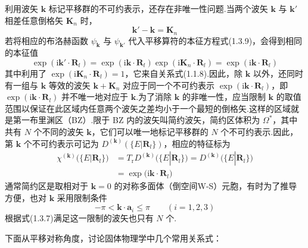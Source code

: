 利用波矢 $\boldsymbol{k}$ 标记平移群的不可约表示，还存在非唯一性问题.当两个波矢 $\boldsymbol{k}$ 与 $\boldsymbol{k}'$ 相差任意倒格矢 $\boldsymbol{K}_n$ 时，
\begin{equation}
  \boldsymbol{k}'-\boldsymbol{k}=\boldsymbol{K}_n
\end{equation}
若将相应的布洛赫函数 $\psi_{\boldsymbol{k}}$ 与 $\psi_{\boldsymbol{k}'}$ 代入平移算符的本征方程式(1.3.9)，会得到相同的本征值
\begin{equation}
  \exp(\mathrm{i}\boldsymbol{k}'\cdot\boldsymbol{R}_l)
  =\exp(\mathrm{i}\boldsymbol{k}\cdot\boldsymbol{R}_l)
  \exp(\mathrm{i}\boldsymbol{K}_n\cdot\boldsymbol{R}_l)
  =\exp(\mathrm{i}\boldsymbol{k}\cdot\boldsymbol{R}_l)
\end{equation}
其中利用了 $\exp(\mathrm{i}\boldsymbol{K}_n\cdot\boldsymbol{R}_l)=1$，它来自关系式(1.1.8).因此，除 $\boldsymbol{k}$ 以外，还同时有一组与 $\boldsymbol{k}$ 等效的波矢 $\boldsymbol{k}+\boldsymbol{K}_n$ 对应于同一个不可约表示 $\exp(\mathrm{i}\boldsymbol{k}\cdot\boldsymbol{R}_l)$，即 $\exp(\mathrm{i}\boldsymbol{k}\cdot\boldsymbol{R}_l)$ 并不唯一地对应于 $\boldsymbol{k}$.为了消除 $\boldsymbol{k}$ 的非唯一性，应当限制 $\boldsymbol{k}$ 的取值范围以保证在此区域内任意两个波矢之差均小于一个最短的倒格矢.这样的区域就是第一布里渊区（BZ）.限于 BZ 内的波矢叫简约波矢，简约区体积为 $\Omega^{*}$，其中共有 $N$ 个不同的波矢 $\boldsymbol{k}$，它们可以唯一地标记平移群的 $N$ 个不可约表示.因此，第 $\boldsymbol{k}$ 个不可约表示可记为 $D^{(\boldsymbol{k})}(\{E|\boldsymbol{R}_l\})$，相应的特征标为
\begin{equation}
\begin{aligned}
  \chi^{(\boldsymbol{k})}\bigl(\{E|\boldsymbol{R}_l\}\bigr)
  &=T_{\mathrm{r}}D^{(\boldsymbol{k})}\bigl(\{E|\boldsymbol{R}_l\}\bigr)
  =D^{(\boldsymbol{k})}\bigl(\{E|\boldsymbol{R}_l\}\bigr)\\
  &=\exp\bigl(\mathrm{i}\boldsymbol{k}\cdot\boldsymbol{R}_l\bigr)
\end{aligned}
\end{equation}
通常简约区是取相对于 $\boldsymbol{k}=0$ 的对称多面体（倒空间W-S）元胞，有时为了推导方便，也对 $\boldsymbol{k}$ 采用限制条件
\begin{equation}
  -\pi<\boldsymbol{k}\cdot\boldsymbol{a}_i\leqslant\pi\qquad(i=1,2,3)
\end{equation}
根据式(1.3.7)满足这一限制的波矢也只有 $N$ 个.

下面从平移对称角度，讨论固体物理学中几个常用关系式：

